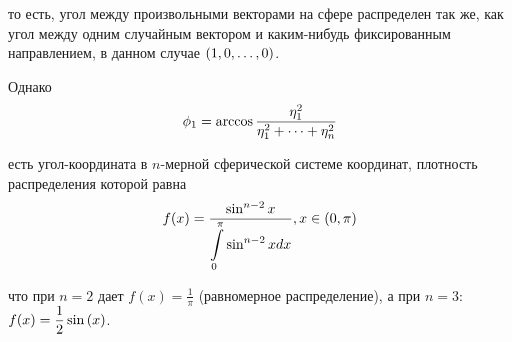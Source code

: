 то есть, угол между произвольными векторами на сфере распределен так же, как угол между одним случайным вектором и каким-нибудь фиксированным направлением, в данном случае $\left( 1, 0, \dots, 0 \right)$. \par
	Однако
\begin{gather}
	\phi_1 = \arccos \frac{ \eta_1^2 }{ \eta_1^2 + \dots + \eta_n^2 } \notag
\end{gather}

есть угол-координата в $n$-мерной сферической системе координат, плотность распределения которой равна
\begin{gather}
	f(x) = \frac{ \sin^{n-2} x }{ \displaystyle \int\limits_{0}^{\pi} \sin^{n-2} x dx }, x \in \left( 0, \pi \right) \notag
\end{gather}

что при $n = 2$ дает $f(x) = \displaystyle \frac{1}{\pi}$ (равномерное распределение), а при $n = 3$: $ f(x) = \displaystyle \frac{1}{2} \sin \left( x \right)$.
